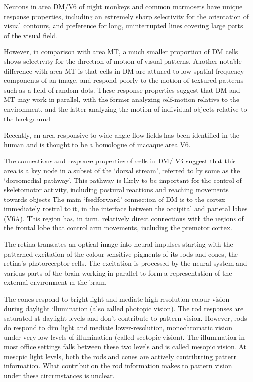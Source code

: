 \documentclass[]{book}
\begin{document}
Neurons in area DM/V6 of night monkeys and common marmosets have unique response properties, including an extremely sharp selectivity for the orientation of visual contours, and preference for long, uninterrupted lines covering large parts of the visual field.

However, in comparison with area MT, a much smaller proportion of DM cells shows selectivity for the direction of motion of visual patterns. Another notable difference with area MT is that cells in DM are attuned to low spatial frequency components of an image, and respond poorly to the motion of textured patterns such as a field of random dots. These response properties suggest that DM and MT may work in parallel, with the former analyzing self-motion relative to the environment, and the latter analyzing the motion of individual objects relative to the background.

Recently, an area responsive to wide-angle flow fields has been identified in the human and is thought to be a homologue of macaque area V6.

The connections and response properties of cells in DM/ V6 suggest that this area is a key node in a subset of the `dorsal stream', referred to by some as the `dorsomedial pathway'. This pathway is likely to be important for the control of skeletomotor activity, including postural reactions and reaching movements towards objects The main `feedforward' connection of DM is to the cortex immediately rostral to it, in the interface between the occipital and parietal lobes (V6A). This region has, in turn, relatively direct connections with the regions of the frontal lobe that control arm movements, including the premotor cortex.

The retina translates an optical image into neural impulses starting with the patterned excitation of the colour-sensitive pigments of its rods and cones, the retina's photoreceptor cells. The excitation is processed by the neural system and various parts of the brain working in parallel to form a representation of the external environment in the brain.

The cones respond to bright light and mediate high-resolution colour vision during daylight illumination (also called photopic vision). The rod responses are saturated at daylight levels and don't contribute to pattern vision. However, rods do respond to dim light and mediate lower-resolution, monochromatic vision under very low levels of illumination (called scotopic vision). The illumination in most office settings falls between these two levels and is called mesopic vision. At mesopic light levels, both the rods and cones are actively contributing pattern information. What contribution the rod information makes to pattern vision under these circumstances is unclear.
\end{document}
